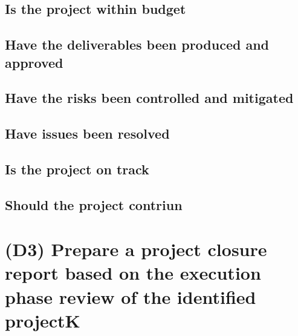 \documentclass{article}
\begin{document}
		\subsection{Is the project within budget}
		\subsection{Have the deliverables been produced and approved}
		\subsection{Have the risks been controlled and mitigated}
		\subsection{Have issues been resolved}
		\subsection{Is the project on track}
		\subsection{Should the project contriun}


\section{(D3) Prepare a project closure report based on the execution phase review of the identified projectK}
\end{document}
